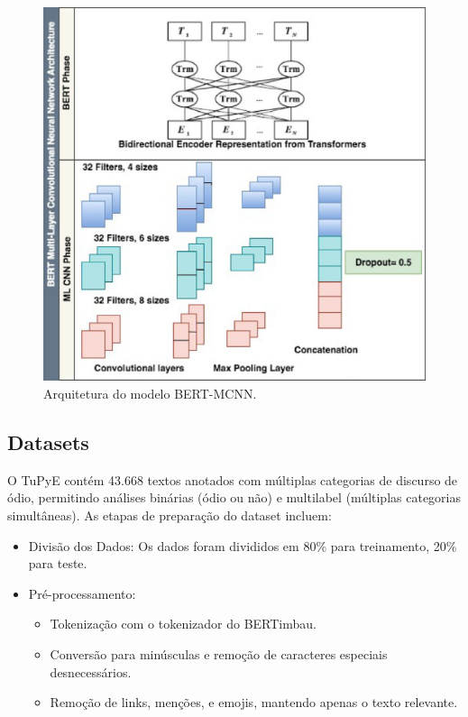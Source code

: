 \documentclass[sigconf,nonacm]{acmart}
\begin{document}
\begin{figure}[H]
  \centering
  \includegraphics[width=\linewidth]{./resources/bertcnn_architecture.png}
  \caption{Arquitetura do modelo BERT-MCNN.}
  \label{fig:bertcnn_architecture}
\end{figure}


\subsection{Datasets}
O TuPyE contém 43.668 textos anotados com múltiplas categorias de discurso de ódio, permitindo análises binárias (ódio ou não) e multilabel (múltiplas categorias simultâneas). As etapas de preparação do dataset incluem:

\begin{itemize}
  \item Divisão dos Dados: Os dados foram divididos em 80\% para treinamento, 20\% para teste.
  \item Pré-processamento:
  \begin{itemize}
    \item Tokenização com o tokenizador do BERTimbau.
    \item Conversão para minúsculas e remoção de caracteres especiais desnecessários.
    \item Remoção de links, menções, e emojis, mantendo apenas o texto relevante.
  \end{itemize}
\end{itemize}
\end{document}

